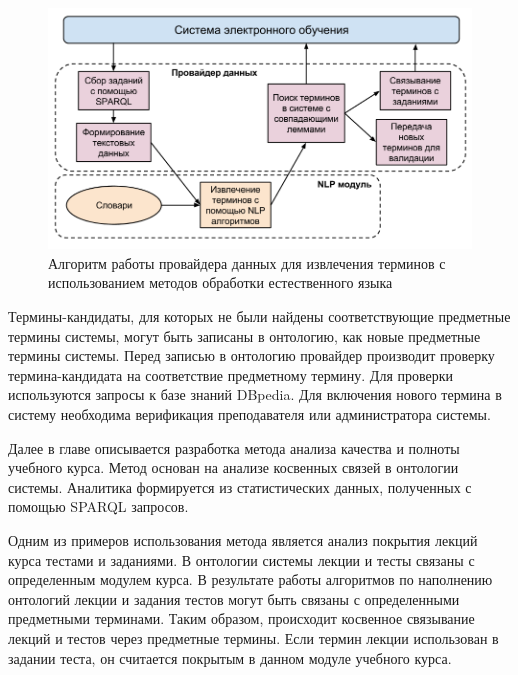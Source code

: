 \begin{figure}[ht] 
  \center
  \includegraphics[scale=0.45]{NLPAlgo}
  \caption{Алгоритм работы провайдера данных для извлечения терминов с использованием методов обработки естественного языка} 
  \label{fig:NLPAlgo}
\end{figure}

Термины-кандидаты, для которых не были найдены соответствующие предметные термины системы, могут быть записаны в онтологию, как новые предметные термины системы. Перед записью в онтологию провайдер производит проверку термина-кандидата на соответствие предметному термину. Для проверки используются запросы к базе знаний DBpedia. Для включения нового термина в систему необходима верификация преподавателя или администратора системы. 

Далее в главе описывается разработка метода анализа качества и полноты учебного курса. Метод основан на анализе косвенных связей в онтологии системы. Аналитика формируется из статистических данных, полученных с помощью SPARQL запросов. 

Одним из примеров использования метода является анализ покрытия лекций курса тестами и заданиями. В онтологии системы лекции и тесты связаны с определенным модулем курса. В результате работы алгоритмов по наполнению онтологий лекции и задания тестов могут быть связаны с определенными предметными терминами. Таким образом, происходит косвенное связывание лекций и тестов через предметные термины. Если термин лекции использован в задании теста, он считается покрытым в данном модуле учебного курса.

